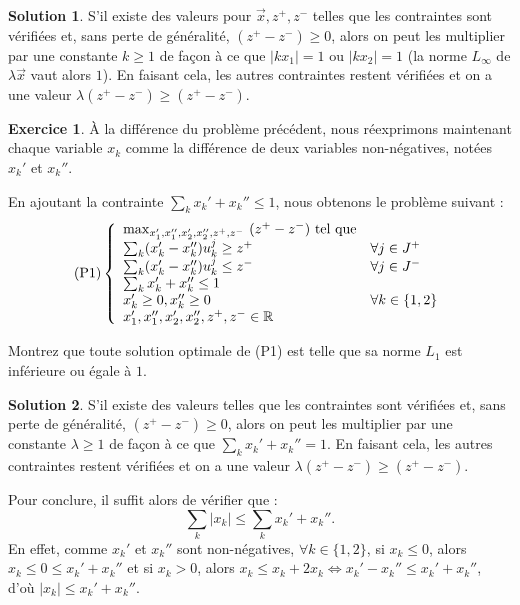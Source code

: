\documentclass[a4paper,francais]{article}
\newcommand{\R}{{\ensuremath\mathbb{R}}}
\theoremstyle{definition}
\newtheorem{exercice}{Exercice}[section]
\newtheorem*{solution}{Solution}
\begin{document}
\begin{solution}
  S'il existe des valeurs pour $\vec{x}, z^+, z^-$ telles que
  les contraintes sont vérifiées et, sans perte de généralité,
  $(z^+ - z^-) \geq 0$, alors on peut les multiplier par une
  constante $k \geq 1$ de façon à ce que $|kx_1|=1$ ou $|kx_2|=1$
  (la norme $L_\infty$ de $\lambda\vec{x}$ vaut alors $1$).
  En faisant cela, les autres contraintes restent vérifiées
  et on a une valeur $\lambda(z^+ - z^-) \geq (z^+ - z^-)$.
\end{solution}

\begin{exercice}
  \`A la différence du problème précédent, nous réexprimons
  maintenant chaque variable $x_k$ comme la différence de deux
  variables non-négatives, notées $x_k'$ et $x_k''$. 

  En ajoutant la contrainte $\sum_k x_k' + x_k'' \leq 1$, nous
  obtenons le problème suivant : 
  \[
  \text{(P1)}
  \left\{
  \begin{array}{ll}
    \max_{x_1',x_1'',x_2',x_2'',z^+,z^-} \  (z^+ - z^-) \ \text{tel que} & \\
    \sum_k (x_k' - x_k'') u_k^j \geq z^+ & \forall j \in J^+ \\ 
    \sum_k (x_k' - x_k'') u_k^j \leq z^- & \forall j \in J^- \\
    \sum_k x_k' + x_k'' \leq 1 \\
    x_k' \geq 0, x_k'' \geq 0 & \forall k \in \{1, 2\} \\
    x_1',x_1'',x_2',x_2'',z^+,z^- \in \R \\
  \end{array}
  \right.
  \]

  Montrez que toute solution optimale de (P1)
  est telle que sa norme $L_1$ est inférieure ou égale à $1$.   
\end{exercice}

\begin{solution}
  S'il existe des valeurs telles que
  les contraintes sont vérifiées et, sans perte de généralité,
  $(z^+ - z^-) \geq 0$, alors on peut les multiplier par une
  constante $\lambda \geq 1$ de façon à ce que $\sum_k x_k' + x_k'' = 1$.
  En faisant cela, les autres contraintes restent vérifiées
  et on a une valeur $\lambda(z^+ - z^-) \geq (z^+ - z^-)$.
  
  Pour conclure, il suffit alors de vérifier que :
  \[ \sum_k |x_k| \leq \sum_k x_k' + x_k''. \]
  En effet, comme $x_k'$ et $x_k''$ sont non-négatives, $\forall k \in \{1, 2\}$,
  si $x_k \leq 0$, alors $x_k \leq 0 \leq x_k' + x_k''$
  et si $x_k > 0$, alors $x_k \leq x_k + 2x_k \Leftrightarrow x_k' - x_k'' \leq x_k' + x_k''$,
  d'où $|x_k| \leq x_k' + x_k''$.
\end{solution}
\end{document}
